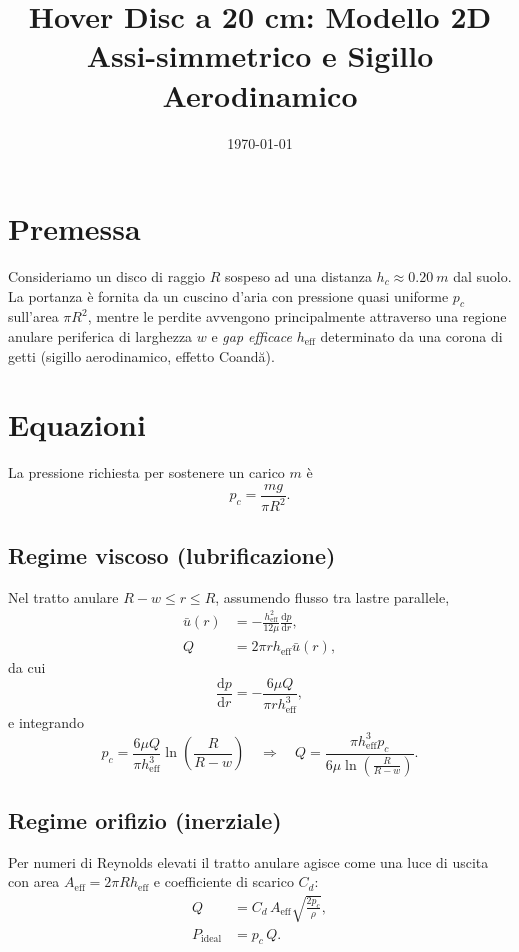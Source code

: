 \documentclass[11pt,a4paper]{article}
\title{Hover Disc a 20 cm: Modello 2D Assi-simmetrico e Sigillo Aerodinamico}
\author{}
\date{\today}
\begin{document}
\maketitle

\section{Premessa}
Consideriamo un disco di raggio $R$ sospeso ad una distanza $h_c \approx \SI{0.20}{m}$ dal suolo. La portanza è fornita da un cuscino d'aria con pressione quasi uniforme $p_c$ sull'area $\pi R^2$, mentre le perdite avvengono principalmente attraverso una regione anulare periferica di larghezza $w$ e \emph{gap efficace} $h_{\mathrm{eff}}$ determinato da una corona di getti (sigillo aerodinamico, effetto Coandă).

\section{Equazioni}
La pressione richiesta per sostenere un carico $m$ è
\begin{equation}
p_c = \frac{m g}{\pi R^2}.
\end{equation}

\subsection{Regime viscoso (lubrificazione)}
Nel tratto anulare $R-w \le r \le R$, assumendo flusso tra lastre parallele,
\begin{align}
\bar u(r) &= -\frac{h_{\mathrm{eff}}^2}{12\mu} \frac{\mathrm{d}p}{\mathrm{d}r},\\
Q &= 2\pi r h_{\mathrm{eff}} \bar u(r),
\end{align}
da cui
\begin{equation}
\frac{\mathrm{d}p}{\mathrm{d}r} = -\frac{6\mu Q}{\pi r h_{\mathrm{eff}}^3},
\end{equation}
e integrando
\begin{equation}
p_c = \frac{6\mu Q}{\pi h_{\mathrm{eff}}^3}\ln\!\left(\frac{R}{R-w}\right)
\quad\Rightarrow\quad
Q = \frac{\pi h_{\mathrm{eff}}^3 p_c}{6\mu \ln\!\left(\frac{R}{R-w}\right)}.
\end{equation}

\subsection{Regime orifizio (inerziale)}
Per numeri di Reynolds elevati il tratto anulare agisce come una luce di uscita con area $A_{\mathrm{eff}} = 2\pi R h_{\mathrm{eff}}$ e coefficiente di scarico $C_d$:
\begin{align}
Q &= C_d\, A_{\mathrm{eff}} \sqrt{\frac{2 p_c}{\rho}},\\
P_{\mathrm{ideal}} &= p_c\, Q.
\end{align}
\end{document}
